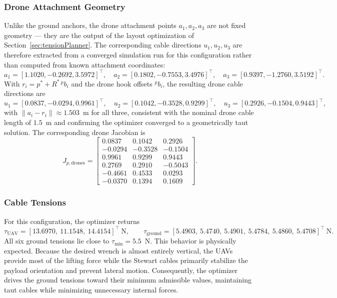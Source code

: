 \subsubsection{Drone Attachment Geometry}
Unlike the ground anchors, the drone attachment points $a_1, a_2, a_3$ are not fixed geometry — they are the output of the layout optimization of Section~\ref{sec:tensionPlanner}. The corresponding cable directions $u_1, u_2, u_3$ are therefore extracted from a converged simulation run for this configuration rather than computed from known attachment coordinates:
\begin{equation}
a_1 = [1.1020, -0.2692, 3.5972]^\top, \quad
a_2 = [0.1802, -0.7553, 3.4976]^\top, \quad
a_3 = [0.9397, -1.2760, 3.5192]^\top.
\end{equation}
With $r_i = p^* + R^*\,{}^p b_i$ and the drone hook offsets ${}^p b_i$, the resulting drone cable
directions are
\begin{equation}
u_1 = [0.0837, -0.0294, 0.9961]^\top, \quad
u_2 = [0.1042, -0.3528, 0.9299]^\top, \quad
u_3 = [0.2926, -0.1504, 0.9443]^\top,
\end{equation}
with $\lVert a_i - r_i \rVert \approx 1.503$~m for all three, consistent with the nominal drone
cable length of $1.5$~m and confirming the optimizer converged to a geometrically taut solution.
The corresponding drone Jacobian is
\begin{equation}
J_{p,\text{drones}} =
\begin{bmatrix}
0.0837 & 0.1042 & 0.2926 \\
-0.0294 & -0.3528 & -0.1504 \\
0.9961 & 0.9299 & 0.9443 \\
0.2769 & 0.2910 & -0.5043 \\
-0.4661 & 0.4533 & 0.0293 \\
-0.0370 & 0.1394 & 0.1609
\end{bmatrix}.
\end{equation}

\subsubsection{Cable Tensions}
For this configuration, the optimizer returns
\begin{equation}
\tau_{\text{UAV}} = [13.6970,\ 11.1548,\ 14.4154]^\top~\text{N}, \qquad
\tau_{\text{ground}} = [5.4903,\ 5.4740,\ 5.4901,\ 5.4784,\ 5.4860,\ 5.4708]^\top~\text{N}.
\end{equation}
All six ground tensions lie close to $\tau_{\min}=5.5$~N. This behavior is physically expected. Because the desired wrench is almost entirely vertical, the UAVs provide most of the lifting force while the Stewart cables primarily stabilize the payload orientation and prevent lateral motion. Consequently, the optimizer drives the ground tensions toward their minimum admissible values, maintaining taut cables while minimizing unnecessary internal forces.


